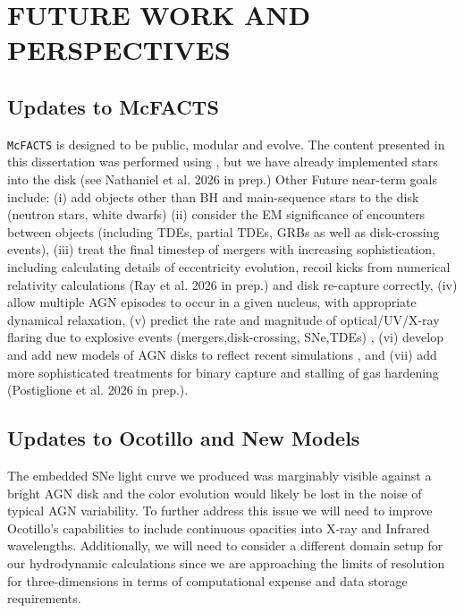 \section{\texorpdfstring{\MakeUppercase{future work and perspectives}}{future work and perspectives}}
\label{sec:chapter-future}



\subsection{Updates to McFACTS}
\texttt{McFACTS} is designed to be public, modular and evolve.
The content presented in this dissertation was performed using , but we have already implemented stars into the disk (see Nathaniel et al. 2026 in prep.)
Other Future near-term goals include:
(i) add objects other than BH and main-sequence stars to the disk (neutron stars, white dwarfs)
(ii) consider the EM significance of encounters between objects (including TDEs, partial TDEs, GRBs as well as disk-crossing events),
(iii) treat the final timestep of mergers with increasing sophistication, including calculating details of eccentricity evolution, recoil kicks from numerical relativity calculations (Ray et al. 2026 in prep.) and disk re-capture correctly,
(iv) allow multiple AGN episodes to occur in a given nucleus, with appropriate dynamical relaxation, (v) predict the rate and magnitude of optical/UV/X-ray flaring due to explosive events (mergers,disk-crossing, SNe,TDEs) \citep{McPike+26-mcfactsIV},
(vi) develop and add new models of AGN disks to reflect recent simulations \citep{Hopkins+24}, and
(vii) add more sophisticated treatments for binary capture \citep{Whitehead+25b} and stalling of gas hardening (Postiglione et al. 2026 in prep.).

\subsection{Updates to Ocotillo and New Models}


The embedded SNe light curve we produced was marginably visible against a bright AGN disk and the color evolution would likely be lost in the noise of typical AGN variability. 
To further address this issue we will need to improve Ocotillo's capabilities to include continuous opacities into X-ray and Infrared wavelengths.
Additionally, we will need to consider a different domain setup for our hydrodynamic calculations since we are approaching the limits of resolution for three-dimensions in terms of computational expense and data storage requirements.

